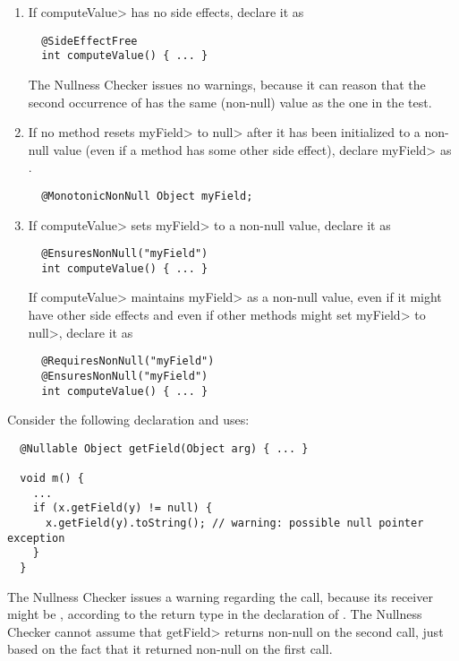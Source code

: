 \begin{enumerate}
\item
  If \<computeValue> has no side effects, declare it as

\begin{Verbatim}
  @SideEffectFree
  int computeValue() { ... }
\end{Verbatim}

\noindent
The Nullness Checker issues no warnings, because it can reason that
the second occurrence of  has the same (non-null) value as
the one in the test.

\item
  If no method resets \<myField> to \<null> after it has been initialized
  to a non-null value (even if a method has some other side effect),
  declare \<myField> as .

\begin{Verbatim}
  @MonotonicNonNull Object myField;
\end{Verbatim}

\item
  If \<computeValue> sets \<myField> to a non-null value, declare it as

\begin{Verbatim}
  @EnsuresNonNull("myField")
  int computeValue() { ... }
\end{Verbatim}

  If \<computeValue> maintains \<myField> as a non-null value, even if it
  might have other side effects and even if other methods might set
  \<myField> to \<null>, declare it as

\begin{Verbatim}
  @RequiresNonNull("myField")
  @EnsuresNonNull("myField")
  int computeValue() { ... }
\end{Verbatim}
\end{enumerate}



Consider the following declaration and uses:

\begin{Verbatim}
  @Nullable Object getField(Object arg) { ... }

  void m() {
    ...
    if (x.getField(y) != null) {
      x.getField(y).toString(); // warning: possible null pointer exception
    }
  }
\end{Verbatim}

The Nullness Checker issues a warning regarding the
 call, because its receiver  might
be , according to the  return type in the
declaration of .  The Nullness Checker cannot assume that
\<getField> returns non-null on the second call, just based on the fact
that it returned non-null on the first call.

